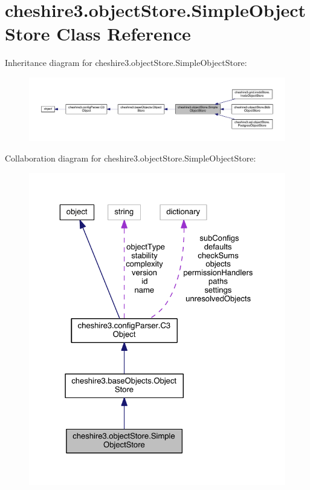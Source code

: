 \hypertarget{classcheshire3_1_1object_store_1_1_simple_object_store}{\section{cheshire3.\-object\-Store.\-Simple\-Object\-Store Class Reference}
\label{classcheshire3_1_1object_store_1_1_simple_object_store}
}


Inheritance diagram for cheshire3.\-object\-Store.\-Simple\-Object\-Store\-:
\nopagebreak
\begin{figure}[H]
\begin{center}
\leavevmode
\includegraphics[width=350pt]{classcheshire3_1_1object_store_1_1_simple_object_store__inherit__graph}
\end{center}
\end{figure}


Collaboration diagram for cheshire3.\-object\-Store.\-Simple\-Object\-Store\-:
\nopagebreak
\begin{figure}[H]
\begin{center}
\leavevmode
\includegraphics[width=325pt]{classcheshire3_1_1object_store_1_1_simple_object_store__coll__graph}
\end{center}
\end{figure}

